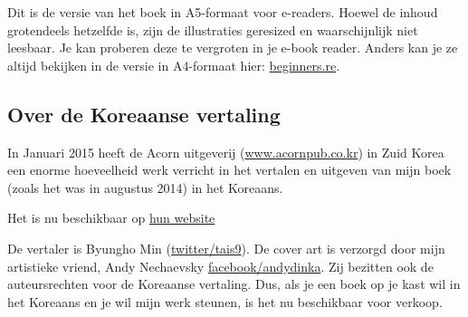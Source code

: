 


\ifdefined\ebook
Dit is de versie van het boek in A5-formaat voor e-readers.
Hoewel de inhoud grotendeels hetzelfde is, zijn de illustraties geresized en waarschijnlijk niet leesbaar.
Je kan proberen deze te vergroten in je e-book reader.
Anders kan je ze altijd bekijken in de versie in A4-formaat hier:
\href{http://go.yurichev.com/17009}{beginners.re}.
\fi


\subsection*{Over de Koreaanse vertaling}

In Januari 2015 heeft de Acorn uitgeverij (\href{http://www.acornpub.co.kr}{www.acornpub.co.kr}) in Zuid Korea een enorme hoeveelheid werk verricht in het vertalen en uitgeven
van mijn boek (zoals het was in augustus 2014) in het Koreaans.

Het is nu beschikbaar op
\href{http://go.yurichev.com/17343}{hun website}

\iffalse
\begin{figure}[H]
\centering
\texttt{[image: acorn\_cover.jpg]}
\end{figure}
\fi

De vertaler is Byungho Min (\href{http://go.yurichev.com/17344}{twitter/tais9}).
De cover art is verzorgd door mijn artistieke vriend, Andy Nechaevsky
\href{http://go.yurichev.com/17023}{facebook/andydinka}.
Zij bezitten ook de auteursrechten voor de Koreaanse vertaling.
Dus, als je een  boek op je kast wil in het Koreaans en je
wil mijn werk steunen, is het nu beschikbaar voor verkoop.
